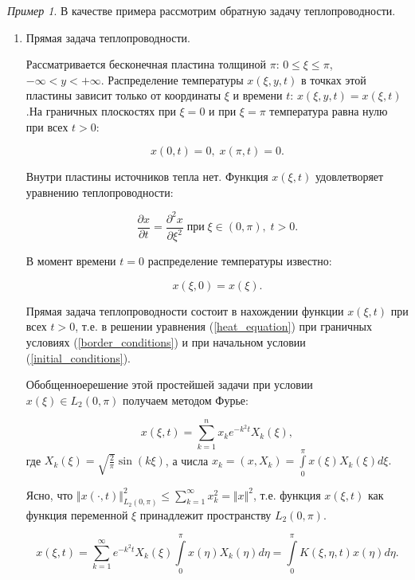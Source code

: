 \documentclass[12pt,a4paper,titlepage,oneside]{book}
\theoremstyle{definition}
\theoremstyle{plain}
\theoremstyle{break}
\theoremstyle{remark}
\theoremstyle{remark}
\newtheorem*{example}{Пример}
\theoremstyle{remark}
\theoremstyle{remark}
\theoremstyle{plain}
\theoremstyle{plain}
\begin{document}
\begin{example}
В качестве примера рассмотрим обратную задачу теплопроводности.

\begin{enumerate}

\item Прямая задача теплопроводности.

Рассматривается бесконечная пластина толщиной $\pi$: $0 \leqslant \xi \leqslant\pi$, $-\infty < y < +\infty$. Распределение температуры $x(\xi, y, t)$ в точках этой пластины зависит только от координаты $\xi$ и времени $t$: $x(\xi, y, t) = x(\xi, t)$.На граничных плоскостях при $\xi = 0$ и при $\xi = \pi$ температура равна нулю при всех $t > 0$:

\begin{equation}
\label{border_conditions}
x(0, t) = 0,\;  x(\pi, t) = 0.
\end{equation}

Внутри пластины источников тепла нет. Функция $x(\xi, t)$ удовлетворяет уравнению теплопроводности:

\begin{equation}
\label{heat_equation}
\frac{\partial x}{\partial t} = \frac{\partial^2 x}{\partial \xi^2} \;  \mbox{при} \;   \xi \in (0, \pi),\;  t > 0.
\end{equation}

В момент времени $t = 0$ распределение температуры известно: 

\begin{equation}
\label{initial_conditions}
x(\xi,0)=x(\xi).
\end{equation}

Прямая задача теплопроводности состоит в нахождении функции $x(\xi,t)$ при всех $t >0$, т.е. в решении уравнения (\ref{heat_equation}) при граничных условиях (\ref{border_conditions}) и при начальном условии (\ref{initial_conditions}).

\guillemotleft Обобщенное\guillemotright \;решение этой простейшей задачи при условии $x(\xi) \in L_2(0, \pi)$ получаем методом Фурье:

$$x(\xi,t) = \displaystyle\sum\limits_{k=1}^n x_k e^{-k^2t} X_k(\xi),$$
где $X_k(\xi) = \sqrt{\frac{2}{\pi}} \sin (k\xi)$, а числа $x_k = (x,X_k) = \displaystyle\int\limits_0^\pi x(\xi) X_k(\xi) d\xi\mbox{.}$

Ясно, что $\Vert x(\cdot, t) \Vert_{L_2 (0, \pi)}^{2} \leqslant \displaystyle\sum\limits_{k=1}^{\infty}x_k^2= \Vert x \Vert^2$, т.е. функция $x(\xi,t)$ как функция переменной $\xi$ принадлежит пространству $L_2 (0, \pi)$.
\begin{center}
$$x(\xi, t) = \displaystyle\sum\limits_{k=1}^{\infty} e^{-k^2 t} X_k(\xi) \int\limits_{0}^{\pi} x(\eta) X_k(\eta) d\eta = \int\limits_{0}^{\pi} K(\xi, \eta, t) x(\eta) d \eta \mbox{.}$$
\end{center}


\end{enumerate}
\end{example}
\end{document}
